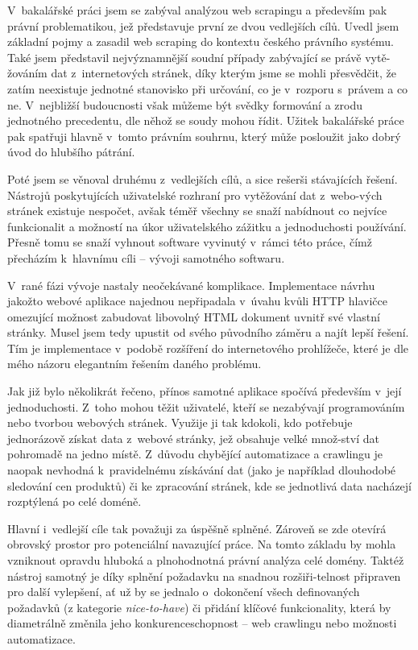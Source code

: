 \documentclass[thesis=B,czech]{FITthesis}[2012/06/26]
\begin{document}
\begin{conclusion}
	V~bakalářské práci jsem se zabýval analýzou web scrapingu a především pak právní problematikou, jež představuje první ze dvou vedlejších cílů. Uvedl jsem základní pojmy a zasadil web scraping do kontextu českého právního systému. Také jsem představil nejvýznamnější soudní případy zabývající se právě vytě-žováním dat z~internetových stránek, díky kterým jsme se mohli přesvědčit, že zatím neexistuje jednotné stanovisko při určování, co je v~rozporu s~právem a co ne. V~nejbližší budoucnosti však můžeme být svědky formování a zrodu jednotného precedentu, dle něhož se soudy mohou řídit. Užitek bakalářské práce pak spatřuji hlavně v~tomto právním souhrnu, který může posloužit jako dobrý úvod do hlubšího pátrání.
	
	Poté jsem se věnoval druhému z~vedlejších cílů, a sice rešerši stávajících řešení. Nástrojů poskytujících uživatelské rozhraní pro vytěžování dat z~webo-vých stránek existuje nespočet, avšak téměř všechny se snaží nabídnout co nejvíce funkcionalit a možností na úkor uživatelského zážitku a jednoduchosti používání. Přesně tomu se snaží vyhnout software vyvinutý v~rámci této práce, čímž přecházím k~hlavnímu cíli -- vývoji samotného softwaru.
	
	V~rané fázi vývoje nastaly neočekávané komplikace. Implementace návrhu jakožto webové aplikace najednou nepřipadala v~úvahu kvůli HTTP hlavičce omezující možnost zabudovat libovolný HTML dokument uvnitř své vlastní stránky. Musel jsem tedy upustit od svého původního záměru a najít lepší řešení. Tím je implementace v~podobě rozšíření do internetového prohlížeče, které je dle mého názoru elegantním řešením daného problému.
	
	Jak již bylo několikrát řečeno, přínos samotné aplikace spočívá především v~její jednoduchosti. Z~toho mohou těžit uživatelé, kteří se nezabývají programováním nebo tvorbou webových stránek. Využije ji tak kdokoli, kdo potřebuje jednorázově získat data z~webové stránky, jež obsahuje velké množ-ství dat pohromadě na jedno místě. Z~důvodu chybějící automatizace a crawlingu je naopak nevhodná k~pravidelnému získávání dat (jako je například dlouhodobé sledování cen produktů) či ke zpracování stránek, kde se jednotlivá data nacházejí rozptýlená po celé doméně.
	
	Hlavní i~vedlejší cíle tak považuji za úspěšně splněné. Zároveň se zde otevírá obrovský prostor pro potenciální navazující práce. Na tomto základu by mohla vzniknout opravdu hluboká a plnohodnotná právní analýza celé domény. Taktéž nástroj samotný je díky splnění požadavku na snadnou rozšiři-telnost připraven pro další vylepšení, ať už by se jednalo o~dokončení všech definovaných požadavků (z kategorie \textit{nice-to-have}) či přidání klíčové funkcionality, která by diametrálně změnila jeho konkurenceschopnost -- web crawlingu nebo možnosti automatizace.
\end{conclusion}
\end{document}
